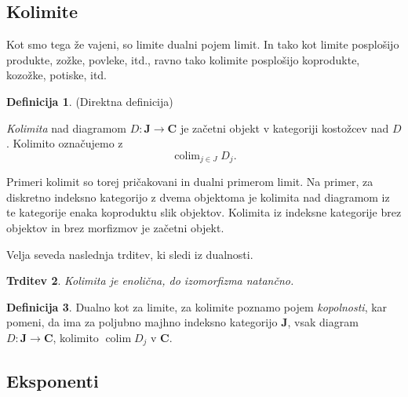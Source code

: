 \documentclass[12pt,a4paper]{book}
\theoremstyle{definition}
\newtheorem{definicija}{Definicija}[chapter]
\theoremstyle{plain}
\newtheorem{trditev}[definicija]{Trditev}
\theoremstyle{definition}
\theoremstyle{remark}
\newcommand{\cat}[1]{\textbf{#1}}
\DeclareMathOperator{\colim}{colim}
\begin{document}
\subsection{Kolimite}

Kot smo tega že vajeni, so limite dualni pojem limit. In tako kot limite posplošijo produkte, zožke, povleke, itd., ravno tako kolimite posplošijo koprodukte, kozožke, potiske, itd.

\begin{definicija} (Direktna definicija)

\emph{Kolimita} nad diagramom $D : \cat{J} \to \cat{C}$ je začetni objekt v kategoriji kostožcev nad $D$. Kolimito označujemo z
$$\colim_{j \in J} D_j.$$
\end{definicija}

Primeri kolimit so torej pričakovani in dualni primerom limit. Na primer, za diskretno indeksno kategorijo z dvema objektoma je kolimita nad diagramom iz te kategorije enaka koproduktu slik objektov. Kolimita iz indeksne kategorije brez objektov in brez morfizmov je začetni objekt.


Velja seveda naslednja trditev, ki sledi iz dualnosti.

\begin{trditev}
Kolimita je enolična, do izomorfizma natančno.
\end{trditev}

\begin{definicija}
Dualno kot za limite, za kolimite poznamo pojem \emph{kopolnosti}, kar pomeni, da ima za poljubno majhno indeksno kategorijo $\cat{J}$, vsak diagram $D : \cat{J} \to \cat{C}$, kolimito $\colim D_j$ v $\cat{C}$.
\end{definicija}

\subsection{Eksponenti} \label{poglavje:eksponenti}
\end{document}
